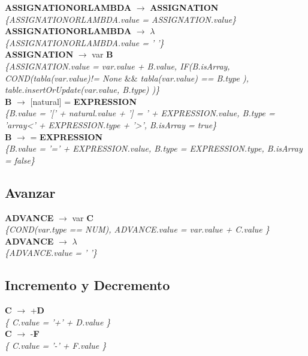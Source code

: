 \documentclass[10pt,a4paper]{article}
\begin{document}
\textbf{ASSIGNATIONORLAMBDA} $\rightarrow$ \textbf{ASSIGNATION} \\
\textit{\{ASSIGNATIONORLAMBDA.value = ASSIGNATION.value\}} \\

\textbf{ASSIGNATIONORLAMBDA} $\rightarrow$ $\lambda$ \\
\textit{\{ASSIGNATIONORLAMBDA.value = ' '\}} \\

\textbf{ASSIGNATION} $\rightarrow$ var \textbf{B} \\
\textit{\{ASSIGNATION.value = var.value + B.value, 
IF(B.isArray, COND(tabla(var.value)!= None $\&\&$ tabla(var.value) == B.type ), table.insertOrUpdate(var.value, B.type) )\}} \\

\textbf{B} $\rightarrow$ [natural] = \textbf{EXPRESSION}  \\
\textit{\{B.value = '[' + natural.value + '] = ' + EXPRESSION.value, B.type = 'array<' + EXPRESSION.type + '>', B.isArray = true\}} \\

\textbf{B} $\rightarrow$ = \textbf{EXPRESSION} \\
\textit{\{B.value = '=' + EXPRESSION.value, B.type = EXPRESSION.type, B.isArray = false\}} \\

\subsection{Avanzar}
\textbf{ADVANCE} $\rightarrow$ var \textbf{C} \\
\textit{\{COND(var.type == NUM), ADVANCE.value = var.value + C.value  \}} \\

\textbf{ADVANCE} $\rightarrow$ $\lambda$ \\
\textit{\{ADVANCE.value = ' '\}} \\

\subsection{Incremento y Decremento}
\textbf{C} $\rightarrow$ +\textbf{D} \\ 
\textit{\{ C.value = '+' + D.value   \}} \\

\textbf{C} $\rightarrow$ -\textbf{F} \\
\textit{\{ C.value = '-' + F.value   \}} \\
\end{document}
